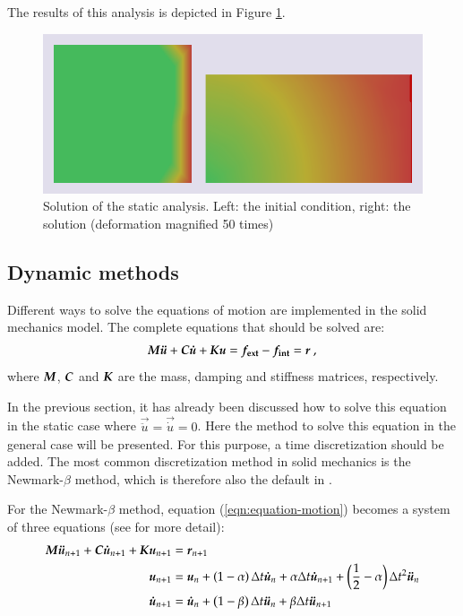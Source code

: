 The     results     of    this     analysis     is     depicted    in     Figure
\ref{fig:smm:implicit:static_solution}.

\begin{figure}[!htb]
  \centering
  \includegraphics[width=.6\linewidth]{figures/static_analysis}
  \caption{Solution of the static  analysis. Left: the initial condition, right:
    the solution (deformation magnified 50 times)}
  \label{fig:smm:implicit:static_solution}
\end{figure}

\subsection{Dynamic methods} \label{sect:smm:Dynamic_methods}

Different ways  to solve  the equations  of motion are  implemented in  the solid
mechanics model.  The complete equations that should be solved are:
\begin{equation}\label{eqn:equation-motion}
  \boldsymbol{M}\boldsymbol{\ddot{u}}     +    \boldsymbol{C}\boldsymbol{\dot{u}}    +     \boldsymbol{K}\boldsymbol{u}    =
  \boldsymbol{f_{{\mathrm{ext}}}} - \boldsymbol{f_{{\mathrm{int}}}} = \boldsymbol{r}~,
\end{equation}
where $\boldsymbol{M}$,  $\boldsymbol{C}$ and  $\boldsymbol{K}$ are the  mass, damping  and stiffness
matrices, respectively.

In  the previous  section,  it has  already  been discussed  how  to solve  this
equation in  the static case where  $\vec{\ddot{u}} = \vec{\dot{u}}  = 0$.  Here
the method  to solve this equation in  the general case will  be presented.  For
this  purpose,  a  time  discretization   should  be  added.   The  most  common
discretization method in solid mechanics is the Newmark-$\beta$ method, which is
therefore also the default in \akantu.

For the  Newmark-$\beta$ method, equation  (\ref{eqn:equation-motion}) becomes a
system  of three  equations  (see \cite{curnier92a}  \cite{hughes-83a} for  more
detail):
\begin{align}
  \boldsymbol{M}   \boldsymbol{\ddot{u}}_{n+1}  +   \boldsymbol{C}   \boldsymbol{\dot{u}}_{n+1}  +   \boldsymbol{K}
  \boldsymbol{u}_{n+1} &= \boldsymbol{r}_{n+1} \label{eqn:equation-motion-discret} \\
  \boldsymbol{u}_{n+1}   &=   \boldsymbol{u}_{n}   +   \left(1  -   \alpha\right)   \Delta   t
  \boldsymbol{\dot{u}}_{n} + \alpha \Delta  t \boldsymbol{\dot{u}}_{n+1} + \left(\frac{1}{2} -
    \alpha\right) \Delta t^2 \boldsymbol{\ddot{u}}_{n} \label{eqn:finite-difference-1}\\
  \boldsymbol{\dot{u}}_{n+1}  &= \boldsymbol{\dot{u}}_{n}  + \left(1  - \beta\right)  \Delta t
  \boldsymbol{\ddot{u}}_{n}            +            \beta           \Delta            t
  \boldsymbol{\ddot{u}}_{n+1} \label{eqn:finite-difference-2}
\end{align}

